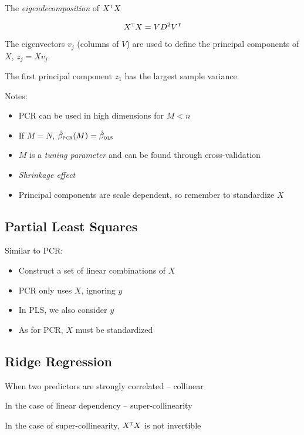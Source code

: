 \documentclass[twoside,twocolumn,10pt]{revtex4-1}
\begin{document}
	The \textit{eigendecomposition} of $X^\textsc{t}X$ 
	
	\begin{equation*}
	X^\textsc{t}X = VD^2V^\textsc{t}
	\end{equation*}
	
	The eigenvectors $v_j$ (columns of $V$) are used to define the principal components of $X$, $z_j = X v_j$.
	
	The first principal component $z_1$ has the largest sample variance.
	
	Notes:
	
	\begin{itemize}
	\item PCR can be used in high dimensions for $M < n$
	\item If $M = N$, $\hat{\beta}_\textsc{pcr} (M) = \hat{\beta}_\textsc{ols}$
	\item $M$ is a \textit{tuning parameter} and can be found through cross-validation
	\item \textit{Shrinkage effect}
	\item Principal components are scale dependent, so remember to standardize $X$
	\end{itemize}
	
	\subsection{Partial Least Squares}
	
	Similar to PCR:
	
	\begin{itemize}
	\item Construct a set of linear combinations of $X$
	\item PCR only uses $X$, ignoring $y$
	\item In PLS, we also consider $y$
	\item As for PCR, $X$ must be standardized
	\end{itemize}
	
	\subsection{Ridge Regression}
	
	When two predictors are strongly correlated – collinear
	
	In the case of linear dependency – super-collinearity
	
	In the case of super-collinearity, $X^\textsc{t}X$ is not invertible
	
\end{document}

